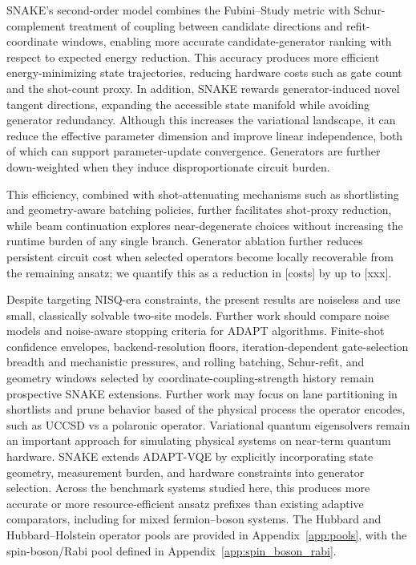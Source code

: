 \documentclass[
  reprint,
  amsmath,
  amssymb,
  aps,
  pra,
  nofootinbib,
  superscriptaddress,
  floatfix
]{revtex4-2}
\newcommand{\placeholder}[1]{\textcolor{red!70!black}{\ifmmode\left[#1\right]\else\textsf{[#1]}\fi}}
\begin{document}
SNAKE's second-order model combines the Fubini--Study metric with Schur-complement treatment of coupling between candidate directions and refit-coordinate windows, enabling more accurate candidate-generator ranking with respect to expected energy reduction. This accuracy produces more efficient energy-minimizing state trajectories, reducing hardware costs such as gate count and the shot-count proxy. In addition, SNAKE rewards generator-induced novel tangent directions, expanding the accessible state manifold while avoiding generator redundancy. Although this increases the variational landscape, it can reduce the effective parameter dimension and improve linear independence, both of which can support parameter-update convergence. Generators are further down-weighted when they induce disproportionate circuit burden.

This efficiency, combined with shot-attenuating mechanisms such as shortlisting and geometry-aware batching policies, further facilitates shot-proxy reduction, while beam continuation explores near-degenerate choices without increasing the runtime burden of any single branch. Generator ablation further reduces persistent circuit cost when selected operators become locally recoverable from the remaining ansatz; we quantify this as a reduction in \placeholder{costs} by up to \placeholder{xxx}.

Despite targeting NISQ-era constraints, the present results are noiseless and use small, classically solvable two-site models. Further work should compare noise models and noise-aware stopping criteria for ADAPT algorithms. Finite-shot confidence envelopes, backend-resolution floors, iteration-dependent gate-selection breadth and mechanistic pressures, and rolling batching, Schur-refit, and geometry windows selected by coordinate-coupling-strength history remain prospective SNAKE extensions. Further work may focus on lane partitioning in shortlists and prune behavior based of the physical process the operator encodes, such as UCCSD vs a polaronic operator.
Variational quantum eigensolvers remain an important approach for simulating physical systems on near-term quantum hardware. SNAKE extends ADAPT-VQE by explicitly incorporating state geometry, measurement burden, and hardware constraints into generator selection. Across the benchmark systems studied here, this produces more accurate or more resource-efficient ansatz prefixes than existing adaptive comparators, including for mixed fermion--boson systems. The Hubbard and Hubbard--Holstein operator pools are provided in Appendix~\ref{app:pools}, with the spin-boson/Rabi pool defined in Appendix~\ref{app:spin_boson_rabi}.
\end{document}
